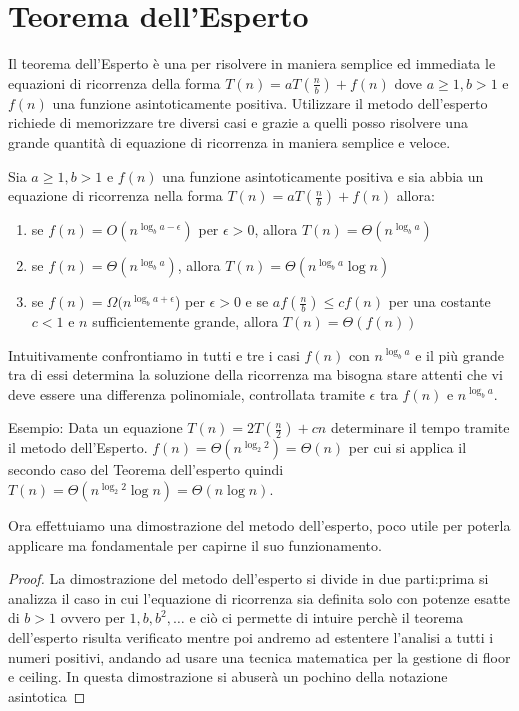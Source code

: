 \section{Teorema dell'Esperto}
Il teorema dell'Esperto è una per risolvere in maniera semplice ed immediata
le equazioni di ricorrenza della forma $T(n) = aT(\frac{n}{b}) + f(n)$
dove $a \geq 1 , b > 1$ e $f(n)$ una funzione asintoticamente positiva.
Utilizzare il metodo dell'esperto richiede di memorizzare tre diversi casi e grazie
a quelli posso risolvere una grande quantità di equazione di ricorrenza in maniera semplice e veloce.

\begin{thm}
Sia $a \geq 1, b > 1$ e $f(n)$ una funzione asintoticamente positiva e sia abbia
un equazione di ricorrenza nella forma $T(n) = aT(\frac{n}{b}) + f(n)$ allora:
\begin{enumerate}
  \item se $f(n) = O(n^{\log _b  a - \epsilon})$ per $\epsilon > 0$, allora $T(n) = \Theta(n^{\log _b  a})$
  \item se $f(n) = \Theta(n^{\log _b a})$, allora $T(n) = \Theta(n^{\log _b  a} \log n)$
  \item se $f(n) = \Omega(n^{\log _b  a + \epsilon}$) per $\epsilon > 0$ e se
        $af(\frac{n}{b}) \leq cf(n)$ per una costante $c < 1$ e $n$ sufficientemente grande,
        allora $T(n) = \Theta(f(n))$
\end{enumerate}
\end{thm}
Intuitivamente confrontiamo in tutti e tre i casi $f(n)$ con $n ^{\log _ b  a}$ e il più grande tra di essi determina la soluzione della ricorrenza
ma bisogna stare attenti che vi deve essere una differenza polinomiale, controllata tramite $\epsilon$ tra $f(n)$ e $n^{\log _b  a}$.

Esempio:\newline
Data un equazione $T(n) = 2T(\frac{n}{2}) + cn$ determinare il tempo tramite il metodo dell'Esperto.
$f(n) = \Theta(n^{\log _ 2 2}) = \Theta(n)$ per cui si applica il secondo caso del Teorema dell'esperto
quindi $T(n) = \Theta(n^{\log _2 2} \log n) = \Theta(n \log n)$.

Ora effettuiamo una dimostrazione del metodo dell'esperto, poco utile per poterla applicare ma fondamentale per capirne il suo funzionamento.
\begin{proof}
La dimostrazione del metodo dell'esperto si divide in due parti:prima si analizza il caso in cui l'equazione di ricorrenza sia definita solo con potenze esatte di
$b > 1$ ovvero per $1, b, b^2, \dots$ e ciò ci permette di intuire perchè il teorema dell'esperto risulta verificato mentre poi andremo ad estentere l'analisi a tutti 
i numeri positivi, andando ad usare una tecnica matematica per la gestione di floor e ceiling.\newline
In questa dimostrazione si abuserà un pochino della notazione asintotica 
\end{proof}

